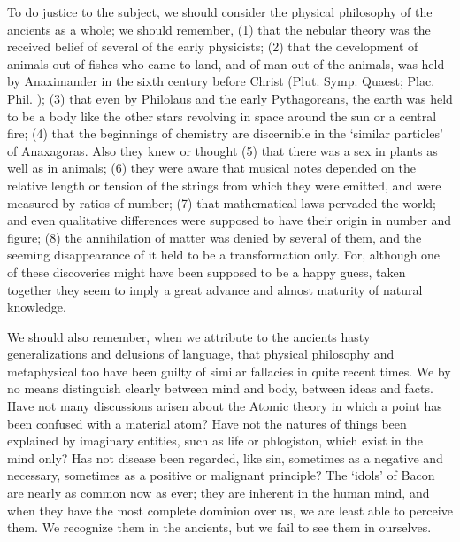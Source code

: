 \documentclass[11pt,letter]{article}
\begin{document}
\par  To do justice to the subject, we should consider the physical philosophy of the ancients as a whole; we should remember, (1) that the nebular theory was the received belief of several of the early physicists; (2) that the development of animals out of fishes who came to land, and of man out of the animals, was held by Anaximander in the sixth century before Christ (Plut. Symp. Quaest; Plac. Phil. ); (3) that even by Philolaus and the early Pythagoreans, the earth was held to be a body like the other stars revolving in space around the sun or a central fire; (4) that the beginnings of chemistry are discernible in the ‘similar particles’ of Anaxagoras. Also they knew or thought (5) that there was a sex in plants as well as in animals; (6) they were aware that musical notes depended on the relative length or tension of the strings from which they were emitted, and were measured by ratios of number; (7) that mathematical laws pervaded the world; and even qualitative differences were supposed to have their origin in number and figure; (8) the annihilation of matter was denied by several of them, and the seeming disappearance of it held to be a transformation only. For, although one of these discoveries might have been supposed to be a happy guess, taken together they seem to imply a great advance and almost maturity of natural knowledge.

\par  We should also remember, when we attribute to the ancients hasty generalizations and delusions of language, that physical philosophy and metaphysical too have been guilty of similar fallacies in quite recent times. We by no means distinguish clearly between mind and body, between ideas and facts. Have not many discussions arisen about the Atomic theory in which a point has been confused with a material atom? Have not the natures of things been explained by imaginary entities, such as life or phlogiston, which exist in the mind only? Has not disease been regarded, like sin, sometimes as a negative and necessary, sometimes as a positive or malignant principle? The ‘idols’ of Bacon are nearly as common now as ever; they are inherent in the human mind, and when they have the most complete dominion over us, we are least able to perceive them. We recognize them in the ancients, but we fail to see them in ourselves.
\end{document}
